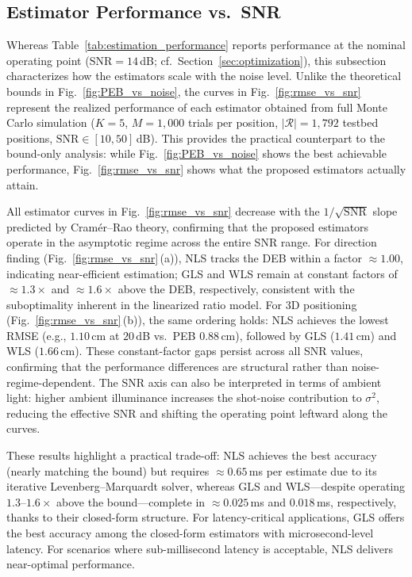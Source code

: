 \documentclass[journal]{IEEEtran}
\begin{document}
\subsection{Estimator Performance vs.\ SNR}
\label{subsec:vs_snr}

Whereas Table~\ref{tab:estimation_performance} reports performance at the nominal operating point ($\mathrm{SNR}=14$\,dB; cf.~Section~\ref{sec:optimization}), this subsection characterizes how the estimators scale with the noise level. Unlike the theoretical bounds in Fig.~\ref{fig:PEB_vs_noise}, the curves in Fig.~\ref{fig:rmse_vs_snr} represent the realized performance of each estimator obtained from full Monte Carlo simulation ($K=5$, $M=1{,}000$ trials per position, $|\mathcal{R}| = 1,792$ testbed positions, $\mathrm{SNR}\in[10,50]$\,dB). This provides the practical counterpart to the bound-only analysis: while Fig.~\ref{fig:PEB_vs_noise} shows the best achievable performance, Fig.~\ref{fig:rmse_vs_snr} shows what the proposed estimators actually attain.

All estimator curves in Fig.~\ref{fig:rmse_vs_snr} decrease with the $1/\sqrt{\mathrm{SNR}}$ slope predicted by Cramér--Rao theory, confirming that the proposed estimators operate in the asymptotic regime across the entire SNR range. For direction finding (Fig.~\ref{fig:rmse_vs_snr}\,(a)), NLS tracks the DEB within a factor ${\approx}1.00$, indicating near-efficient estimation; GLS and WLS remain at constant factors of ${\approx}1.3{\times}$ and ${\approx}1.6{\times}$ above the DEB, respectively, consistent with the suboptimality inherent in the linearized ratio model. For 3D positioning (Fig.~\ref{fig:rmse_vs_snr}\,(b)), the same ordering holds: NLS achieves the lowest RMSE (e.g., $1.10$\,cm at $20$\,dB vs.\ PEB $0.88$\,cm), followed by GLS ($1.41$\,cm) and WLS ($1.66$\,cm). These constant-factor gaps persist across all SNR values, confirming that the performance differences are structural rather than noise-regime-dependent. The SNR axis can also be interpreted in terms of ambient light: higher ambient illuminance increases the shot-noise contribution to $\sigma^2$, reducing the effective SNR and shifting the operating point leftward along the curves.

These results highlight a practical trade-off: NLS achieves the best accuracy (nearly matching the bound) but requires ${\approx}0.65$\,ms per estimate due to its iterative Levenberg--Marquardt solver, whereas GLS and WLS---despite operating $1.3$--$1.6{\times}$ above the bound---complete in ${\approx}0.025$\,ms and $0.018$\,ms, respectively, thanks to their closed-form structure. For latency-critical applications, GLS offers the best accuracy among the closed-form estimators with microsecond-level latency. For scenarios where sub-millisecond latency is acceptable, NLS delivers near-optimal performance.
\end{document}
